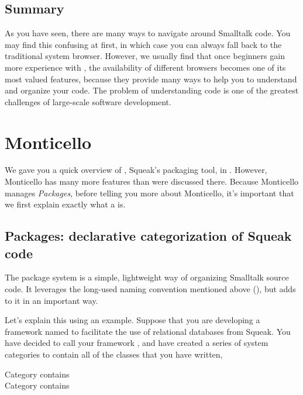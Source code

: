 \documentclass[a4paper,10pt,twoside]{book}
\begin{document}

\subsection{Summary}

As you have seen, there are many ways to navigate around Smalltalk code. 
You may find this confusing at first, in which case you can always fall back to the traditional system browser.
However, we usually find that once beginners gain more experience with \sq, the availability of different browsers becomes one of its most valued features, because they provide many ways to help you to understand and organize your code.
The problem of understanding code is one of the greatest challenges of large-scale software development. 

\section{Monticello}

We gave you a quick overview of , Squeak's packaging tool, in .  
However, Monticello has many more features than were discussed there.  
Because Monticello manages \emph{Packages}, before telling you more about Monticello, it's important that we first explain exactly what a  is.

\subsection{Packages: declarative categorization of Squeak code}

The package system is a simple, lightweight way of organizing Smalltalk source code.
It leverages the long-used naming convention mentioned above (), but adds to it in an important way.

Let's explain this using an example.
Suppose that you are developing a framework named to facilitate the use of relational databases from Squeak. You have decided to call your framework , and have created a series of system categories to contain all of the classes that you have written, \eg

\vspace{1ex}
\noindent
Category  contains \\
Category  contains 
\end{document}
